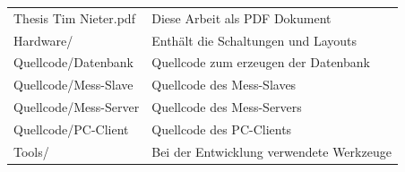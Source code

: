 \begin{appendix}
\begin{table}[H]
\begin{center}
\begin{tabularx}{\textwidth}{ll}
 Thesis Tim Nieter.pdf & Diese Arbeit als PDF Dokument  \\
 Hardware/ & Enthält die Schaltungen und Layouts \\
 Quellcode/Datenbank & Quellcode zum erzeugen der Datenbank \\
 Quellcode/Mess-Slave & Quellcode des Mess-Slaves \\
 Quellcode/Mess-Server & Quellcode des Mess-Servers \\
 Quellcode/PC-Client & Quellcode des PC-Clients \\
 Tools/ & Bei der Entwicklung verwendete Werkzeuge

\end{tabularx}

\label{table_CD}
\end{center}
\end{table}

\end{appendix}
